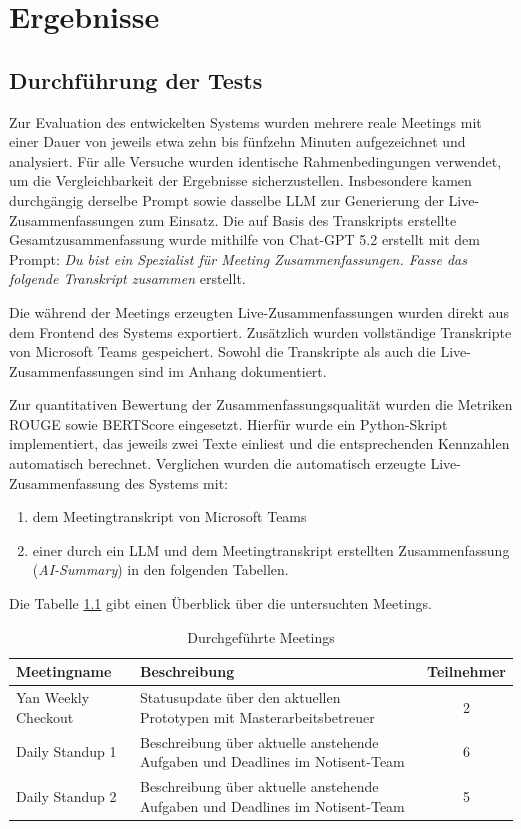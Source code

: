 \chapter{Ergebnisse}
\section{Durchführung der Tests}
Zur Evaluation des entwickelten Systems wurden mehrere reale Meetings mit einer Dauer von jeweils etwa zehn bis fünfzehn Minuten aufgezeichnet und analysiert. Für alle Versuche wurden identische Rahmenbedingungen verwendet, um die Vergleichbarkeit der Ergebnisse sicherzustellen. Insbesondere kamen durchgängig derselbe Prompt sowie dasselbe LLM zur Generierung der Live-Zusammenfassungen zum Einsatz. 
Die auf Basis des Transkripts erstellte Gesamtzusammenfassung wurde mithilfe von Chat-GPT 5.2 erstellt mit dem Prompt: \textit{Du bist ein Spezialist für Meeting Zusammenfassungen. Fasse das folgende Transkript zusammen} erstellt.

Die während der Meetings erzeugten Live-Zusammenfassungen wurden direkt aus dem Frontend des Systems exportiert. Zusätzlich wurden vollständige Transkripte von Microsoft Teams gespeichert. Sowohl die Transkripte als auch die Live-Zusammenfassungen sind im Anhang dokumentiert. 

Zur quantitativen Bewertung der Zusammenfassungsqualität wurden die Metriken ROUGE sowie BERTScore eingesetzt. Hierfür wurde ein Python-Skript implementiert, das jeweils zwei Texte einliest und die entsprechenden Kennzahlen automatisch berechnet. Verglichen wurden die automatisch erzeugte Live-Zusammenfassung des Systems mit: 

\begin{enumerate}
    \item dem Meetingtranskript von Microsoft Teams 
    \item einer durch ein LLM und dem Meetingtranskript erstellten Zusammenfassung (\textit{AI-Summary}) in den folgenden Tabellen.
\end{enumerate}

Die Tabelle \ref{tab:Meetings} gibt einen Überblick über die untersuchten Meetings.

\begin{table}[H]
    \centering
    \begin{tabular}{|p{3.5cm}|p{8cm}|c|}
    \hline
    \textbf{Meetingname} & \textbf{Beschreibung} & \textbf{Teilnehmer}\\
    \hline
    Yan Weekly Checkout & Statusupdate über den aktuellen Prototypen mit Masterarbeitsbetreuer & 2\\
    \hline
    Daily Standup 1& Beschreibung über aktuelle anstehende Aufgaben und Deadlines im Notisent-Team & 6\\
    \hline
    Daily Standup 2& Beschreibung über aktuelle anstehende Aufgaben und Deadlines im Notisent-Team & 5\\
    \hline
    \end{tabular}
    \caption{Durchgeführte Meetings}
    \label{tab:Meetings}
\end{table}

